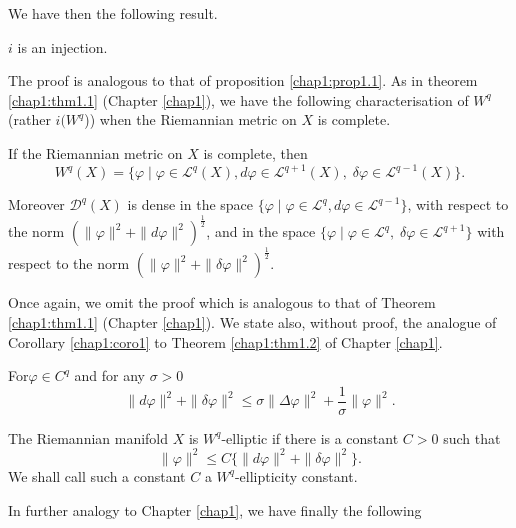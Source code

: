   We have then the following result.

\setcounter{prop}{0}
\begin{prop}%
  $i$ is an injection.

  The proof is analogous to that of proposition
  \ref{chap1:prop1.1}. As in theorem  \ref{chap1:thm1.1}  
  (Chapter \ref{chap1}), we have the following characterisation of $W^q$ (rather
  $i(W^q$))   when the Riemannian metric on $X$ is complete.
\end{prop}

\setcounter{theorem}{0}
\begin{theorem}\label{chap2:thm2.1}%
  If the Riemannian metric on $X$ is complete, then
  $$
 W^q(X) = \{\varphi \mid \varphi \in 
  \mathcal{L}^q(X), d \varphi \in \mathcal{L}^{q+1} (X), \;
  \delta \varphi \in  \mathcal{L}^{q-1}(X)\}. 
$$

  Moreover $\mathscr{D}^q (X)$ is dense in the space $\{\varphi \mid
  \varphi \in \mathcal{L}^q, d \varphi \in \mathcal{L}^{q-1}\}$, 
  with respect to the norm $(\parallel \varphi \parallel^2 +\parallel
  d \varphi \parallel^2)^{\frac{1}{2}}$, and in the space  
  $\{\varphi \mid \varphi \in \mathcal{L}^q, \; \delta \varphi \in
  \mathcal{L}^{q+1}\}$  with respect to the norm $(\parallel  
  \varphi \parallel^2+\parallel \delta \varphi \parallel
  ^2)^{\frac{1}{2}}$. 
  
  Once again, we omit the proof which is analogous to that of Theorem
  \ref{chap1:thm1.1} (Chapter \ref{chap1}). We state also, without
  proof, the  analogue of  Corollary \ref{chap1:coro1} to Theorem
  \ref{chap1:thm1.2} of Chapter \ref{chap1}.   
\end{theorem}

\begin{prop}\label{chap2:prop2.2}%
  For\pageoriginale $\varphi \in C^q$ and for any $\sigma>0$
  $$ 
  \parallel d\varphi \parallel^2+\parallel \delta \varphi \parallel ^2
  \leqslant \sigma \parallel \Delta \varphi  
  \parallel^2+\frac{1}{\sigma}\parallel \varphi \parallel ^2.
  $$
\end{prop}

\setcounter{definition}{0}
\begin{definition}%
  The Riemannian manifold $X$ is $W^q$-elliptic if there is a constant
  $C>0$ such that     
  $$ 
  \parallel \varphi \parallel^2 \leqslant C \bigg\{\parallel d \varphi
  \parallel^2 + \parallel \delta \varphi \parallel^2 \bigg\}.
  $$
We shall call such a constant $C$ a $W^q$-ellipticity constant. 
  
  In  further analogy to Chapter \ref{chap1}, we have finally the following 
\end{definition}

